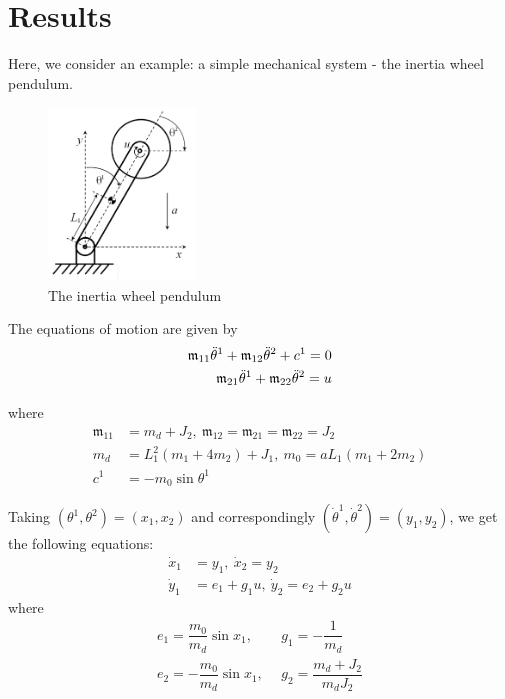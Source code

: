\chapter{Results}

Here, we consider an example: a simple mechanical system - the inertia wheel pendulum.
\begin{figure}[h]
    \centering
    \includegraphics[width=0.35\textwidth]{../Figures/inertia_wheel.png}
    \caption{The inertia wheel pendulum}
    \label{fig:inertia-wheel}
\end{figure}
The equations of motion are given by
\begin{equation}
    \begin{split}
        \mathfrak{m}_{11} \Ddot{\theta}^1 + \mathfrak{m}_{12} \Ddot{\theta}^2 + c^1 = 0\\ 
        \mathfrak{m}_{21} \Ddot{\theta}^1 + \mathfrak{m}_{22} \Ddot{\theta}^2 = u
    \end{split}
\end{equation}

where 
\begin{equation*}
    \begin{split}
        \mathfrak{m}_{11} & = m_d + J_2, \
        \mathfrak{m}_{12} = \mathfrak{m}_{21} = \mathfrak{m}_{22}  = J_2 \\
        m_d  & = L_1^2(m_1 + 4 m_2) + J_1, \
        m_0  = a L_1(m_1 + 2m_2) \\
        c^1  & = -m_0 \sin{\theta^1}
    \end{split}
\end{equation*}

Taking $(\theta^1, \theta^2) = (x_1, x_2)$ and correspondingly $(\dot{\theta}^1, \dot{\theta}^2) = (y_1, y_2)$, we get the following equations:
\begin{equation}
\begin{split}
    \dot{x}_1  & = y_1, \
    \dot{x}_2  = y_2 \\
    \dot{y}_1  & = e_1 + g_1 u, \
    \dot{y}_2  = e_2 + g_2 u
\end{split}
\end{equation}
where 
\begin{equation*}
    \begin{split}
        e_1 = \dfrac{m_0}{m_d}\sin{x_1}, & \ \ g_1 = -\dfrac{1}{m_d} \\
        e_2 = -\dfrac{m_0}{m_d} \sin{x_1}, & \ \ g_2 = \dfrac{m_d + J_2}{m_d J_2}
    \end{split}
\end{equation*}

